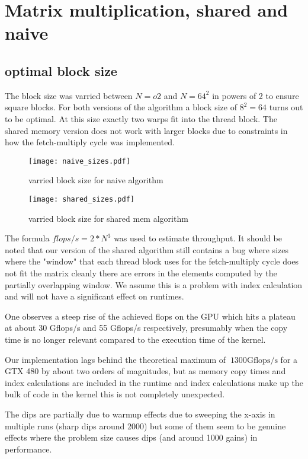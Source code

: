 \section{Matrix multiplication, shared and naive}
\subsection{optimal block size}
The block size was varried between $N=o2$ and $N=64^2$ in powers of 2 to ensure square blocks. For both versions of the algorithm a block size of $8^2=64$ turns out to be optimal. At this size exactly two warps fit into the thread block.
The shared memory version does not work with larger blocks due to constraints in how the fetch-multiply cycle was implemented. 

\begin{figure}[h!]
    \centering
    \texttt{[image: naive\_sizes.pdf]}
    \caption{varried block size for naive algorithm}
    \end{figure}

\begin{figure}[h!]
    \centering
    \texttt{[image: shared\_sizes.pdf]}
    \caption{varried block size for shared mem algorithm}
    \end{figure}

The formula $flops/s = 2*N^3$ was used to estimate throughput. It should be noted that our version of the shared algorithm still contains a bug where sizes where the "window" that each thread block uses for the fetch-multiply cycle does not fit the matrix cleanly there are errors in the elements computed by the partially overlapping window. We assume this is a problem with index calculation and will not have a significant effect on runtimes.

One observes a steep rise of the achieved flops on the GPU which hits a plateau at about 30 Gflops/s and 55 Gflops/s respectively, presumably when the copy time is no longer relevant compared to the execution time of the kernel.

Our implementation lags behind the theoretical maximum of $~1300\mathrm{Gflops/s}$ for a GTX 480 by about two orders of magnitudes, but as memory copy times and index calculations are included in the runtime and index calculations make up the bulk of code in the kernel this is not completely unexpected.

The dips are partially due to warmup effects due to sweeping the x-axis in multiple runs (sharp dips around 2000) but some of them seem to be genuine effects where the problem size causes dips (and around 1000 gains) in performance.

